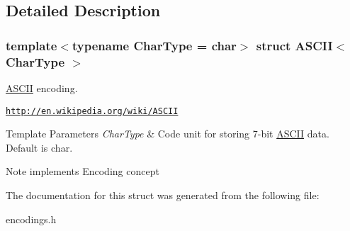 \subsection{Detailed Description}
\subsubsection*{template$<$typename Char\+Type = char$>$\newline
struct A\+S\+C\+I\+I$<$ Char\+Type $>$}

\hyperlink{a02172}{A\+S\+C\+II} encoding. 

\href{http://en.wikipedia.org/wiki/ASCII}{\tt http\+://en.\+wikipedia.\+org/wiki/\+A\+S\+C\+II} 
\begin{DoxyTemplParams}{Template Parameters}
{\em Char\+Type} & Code unit for storing 7-\/bit \hyperlink{a02172}{A\+S\+C\+II} data. Default is char. \\
\hline
\end{DoxyTemplParams}
\begin{DoxyNote}{Note}
implements Encoding concept 
\end{DoxyNote}


The documentation for this struct was generated from the following file\+:\begin{DoxyCompactItemize}
\item 
encodings.\+h\end{DoxyCompactItemize}
